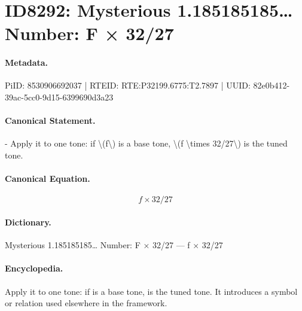 \section*{ID8292: Mysterious 1.185185185… Number: F × 32/27}
\paragraph{Metadata.}
PiID: 8530906692037 | RTEID: RTE:P32199.6775:T2.7897 | UUID: 82e0b412-39ac-5cc0-9d15-6399690d3a23

\paragraph{Canonical Statement.}
- Apply it to one tone: if \textbackslash{}(f\textbackslash{}) is a base tone, \textbackslash{}(f \textbackslash{}times 32/27\textbackslash{}) is the tuned tone.

\paragraph{Canonical Equation.}
\[
f \times 32/27
\]

\paragraph{Dictionary.}
Mysterious 1.185185185… Number: F × 32/27 — f × 32/27

\paragraph{Encyclopedia.}
Apply it to one tone: if is a base tone, is the tuned tone. It introduces a symbol or relation used elsewhere in the framework.

